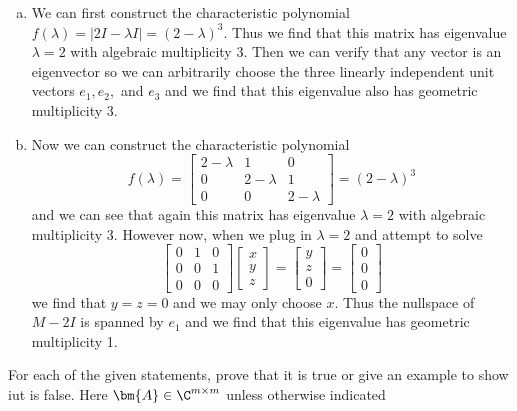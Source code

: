 \documentclass[letter, 12pt]{article}
\begin{document}
\begin{enumerate}[(a)]
\item We can first construct the characteristic polynomial $f(\lambda) = |2I-\lambda I| = (2-\lambda)^3$. Thus we find that this matrix has eigenvalue $\lambda=2$ with algebraic multiplicity 3. Then we can verify that any vector is an eigenvector so we can arbitrarily choose the three linearly independent unit vectors $e_1,e_2,$ and $e_3$ and we find that this eigenvalue also has geometric multiplicity 3.
\item Now we can construct the characteristic polynomial \[f(\lambda) = \begin{bmatrix} 2-\lambda &1&0\\0&2-\lambda&1\\0&0&2-\lambda\end{bmatrix} = (2-\lambda)^3\]
and we can see that again this matrix has eigenvalue $\lambda=2$ with algebraic multiplicity 3. However now, when we plug in $\lambda=2$ and attempt to solve
\[
\begin{bmatrix} 0&1&0\\0&0&1\\0&0&0\end{bmatrix}\begin{bmatrix} x\\y\\z\end{bmatrix} = \begin{bmatrix}y\\z\\0\end{bmatrix} = \begin{bmatrix}0\\0\\0\end{bmatrix}
\]
we find that $y=z=0$ and we may only choose $x$. Thus the nullspace of $M-2I$ is spanned by $e_1$ and we find that this eigenvalue has geometric multiplicity 1.
\end{enumerate}


\pagebreak

\begin{problem}[]
For each of the given statements, prove that it is true or give an example to show iut is false. Here $\bm{A}\in\C^{m\times m}$ unless otherwise indicated
\end{problem}
\end{document}
